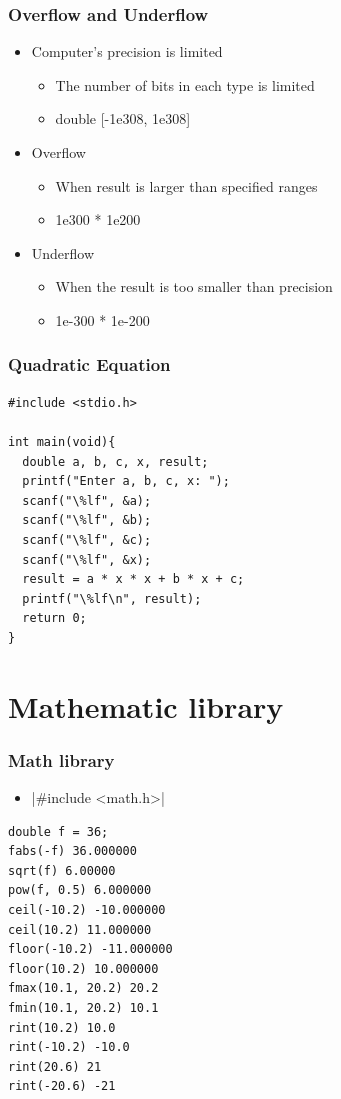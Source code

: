 \documentclass{../c-lecture}
\begin{document}
\begin{frame}
  \frametitle{Overflow and Underflow}
  \begin{itemize}
    \item Computer’s precision is limited
    \begin{itemize}
      \item
        {\color{Orange} The number of bits} in each type is
        limited
      \item double [-1e308, 1e308]
    \end{itemize}
    \item Overflow
    \begin{itemize}
      \item When result is larger than specified ranges
      \item 1e300 * 1e200
    \end{itemize}
    \item Underflow
    \begin{itemize}
      \item When the result is too smaller than precision
      \item 1e-300 * 1e-200
    \end{itemize}
  \end{itemize}
\end{frame}

\begin{frame}[fragile]
  \frametitle{Quadratic Equation}
  \begin{verbatim}
#include <stdio.h>

int main(void){
  double a, b, c, x, result;
  printf("Enter a, b, c, x: ");
  scanf("\%lf", &a);
  scanf("\%lf", &b);
  scanf("\%lf", &c);
  scanf("\%lf", &x);
  result = a * x * x + b * x + c;
  printf("\%lf\n", result);
  return 0;
}
  \end{verbatim}
\end{frame}

\section{Mathematic library}

\begin{frame}[fragile]
  \frametitle{Math library}
  \begin{itemize}
    \item {}|#include <math.h>|
  \end{itemize}
  \begin{verbatim}
double f = 36;
fabs(-f) 36.000000
sqrt(f) 6.00000
pow(f, 0.5) 6.000000
ceil(-10.2) -10.000000
ceil(10.2) 11.000000
floor(-10.2) -11.000000
floor(10.2) 10.000000
fmax(10.1, 20.2) 20.2
fmin(10.1, 20.2) 10.1
rint(10.2) 10.0
rint(-10.2) -10.0
rint(20.6) 21
rint(-20.6) -21
  \end{verbatim}
\end{frame}
\end{document}
